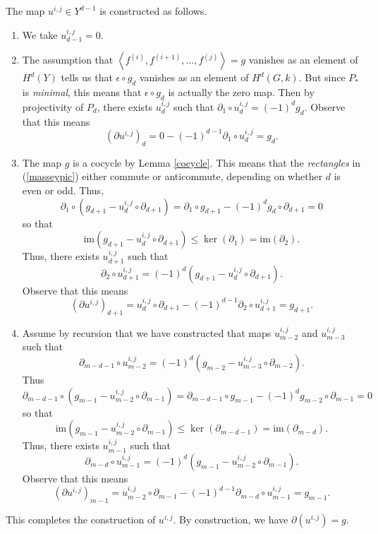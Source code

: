 \documentclass[12pt]{article}
\begin{document}
The map $u^{i,j}\in Y^{d-1}$ is constructed as follows.
\begin{enumerate}
\item\label{zero} We take $u^{i,j}_{d-1}=0$. 
\item The assumption that
$\left\langle f^{\left(i\right)},
f^{\left(i+1\right)},\dots,f^{\left(j\right)}\right\rangle=g$ 
vanishes as an element of $H^d\left(Y\right)$
tells us that $\epsilon\circ g_d$ vanishes
as an element of $H^d\left(G,k\right)$.
But since $P_\ast$ is {\em minimal}, this means
that $\epsilon\circ g_d$ is actually the zero map.
Then by projectivity of $P_d$, there exists
$u^{i,j}_d$ such that $\partial_1\circ u^{i,j}_d=\left(-1\right)^d g_d$.
Observe that this  means
\[\left(\partial u^{i,j}\right)_d
=0-\left(-1\right)^{d-1}\partial_1\circ u^{i,j}_d=g_d.\]
\item The map $g$ is a cocycle by Lemma \ref{cocycle}. 
This means that the {\em rectangles} in (\ref{masseypic})
either commute or anticommute, depending on whether $d$
is even or odd. Thus,
\[\partial_1\circ
\left(g_{d+1}-u_d^{i,j}\circ\partial_{d+1}\right)
=\partial_1\circ g_{d+1}
-\left(-1\right)^d g_d\circ\partial_{d+1}=0\]
so that
\[\mathrm{im}\left(g_{d+1}-
u_d^{i,j}\circ\partial_{d+1}\right)\le\ker\left(\partial_1\right)
=\mathrm{im}\left(\partial_2\right).\]
Thus, there exists $u^{i,j}_{d+1}$ such that
\[\partial_2\circ u^{i,j}_{d+1}=
\left(-1\right)^d\left(g_{d+1}- u_d^{i,j}\circ\partial_{d+1}\right).\]
Observe that this means
\[\left(\partial u^{i,j}\right)_{d+1}
=u^{i,j}_d\circ\partial_{d+1}-\left(-1\right)^{d-1}
\partial_2\circ u^{i,j}_{d+1}=g_{d+1}.\]
\item Assume by recursion that we have constructed that maps $u^{i,j}_{m-2}$ and $u_{m-3}^{i,j}$ such that
\[\partial_{m-d-1}\circ u^{i,j}_{m-2}=
\left(-1\right)^d\left(g_{m-2}
-u_{m-3}^{i,j}\circ\partial_{m-2}\right).\] Thus
\[\partial_{m-d-1}\circ
\left(g_{m-1}-u_{m-2}^{i,j}\circ\partial_{m-1}\right)
=\partial_{m-d-1}\circ g_{m-1}
-\left(-1\right)^d g_{m-2}\circ\partial_{m-1}=0\]
so that
\[\mathrm{im}\left(g_{m-1}-
u_{m-2}^{i,j}\circ\partial_{m-1}\right)\le\ker\left(\partial_{m-d-1}\right)
=\mathrm{im}\left(\partial_{m-d}\right).\]
Thus, there exists $u^{i,j}_{m-1}$ such that
\[\partial_{m-d}\circ u^{i,j}_{m-1}=
\left(-1\right)^d\left(g_{m-1}- u_{m-2}^{i,j}\circ\partial_{m-1}\right).\]
Observe that this means
\[\left(\partial u^{i,j}\right)_{m-1}=
u^{i,j}_{m-2}\circ\partial_{m-1}-\left(-1\right)^{d-1}
\partial_{m-d}\circ u^{i,j}_{m-1}=g_{m-1}.\]
\end{enumerate}
This completes the construction of $u^{i,j}$.
By construction, we have $\partial\left(u^{i,j}\right)=g$.
\end{document}
